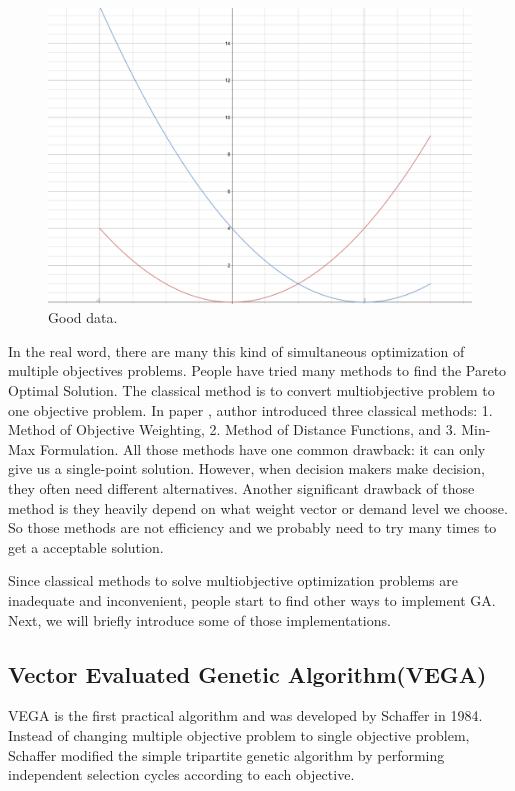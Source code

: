 \begin{figure}[htp] 
\centering
\includegraphics[scale=.4]{images/Figure_1.png}
\caption{Good data.}
\label{fig:goodData}
\end{figure}

In the real word, there are many this kind of simultaneous optimization of multiple objectives problems. People have tried many methods to find the Pareto Optimal Solution. The classical method is to convert multiobjective problem to one objective problem. In paper \cite{NSGA_1994}, author introduced three classical methods: 1. Method of Objective Weighting, 2. Method of Distance Functions, and 3. Min-Max Formulation. All those methods have one common drawback: it can only give us a single-point solution. However, when decision makers make decision, they often need different alternatives. Another significant drawback of those method is they heavily depend on what weight vector or demand level we choose. So those methods are not efficiency and we probably need to try many times to get a acceptable solution.

Since classical methods to solve multiobjective optimization problems are inadequate and inconvenient, people start to find other ways to implement GA. Next, we will briefly introduce some of those implementations.

\subsection{Vector Evaluated Genetic Algorithm(VEGA)}
VEGA is the first practical algorithm and was developed by Schaffer in 1984\cite{Schaffer_1984_Some}. Instead of changing multiple objective problem to single objective problem, Schaffer modified the simple tripartite genetic algorithm by performing independent selection cycles according to each objective.

